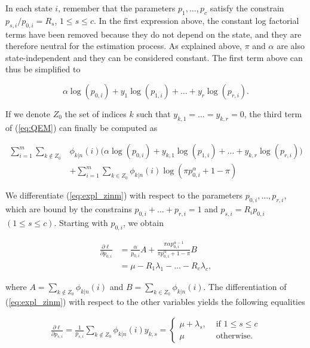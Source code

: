\documentclass[12pt]{article}
\begin{document}
\begin{appendices}
    In each state $i$, remember that the parameters
    $p_1, \ldots, p_c$ satisfy the constrain $p_{s,i}/p_{0,i}=R_s$,
    $1 \leq s \leq c$.  In the first expression above,
    the constant log factorial terms
    have been removed because they do not depend on the state,
    and they are therefore neutral for the
    estimation process. As explained above, $\pi$ and
    $\alpha$ are also state-independent and they can be considered
    constant. The first term above can thus be simplified to

    \begin{equation*}
      \alpha\log(p_{0,i}) + y_1\log(p_{1,i}) + \ldots
      + y_r\log(p_{r,i}).
    \end{equation*}

    If we denote  $Z_0$ the set of indices $k$ such that
    $y_{k,1} = \ldots = y_{k,r} = 0$, the third term of
    (\ref{eq:QEM}) can finally be computed as

    \begin{align}
      \sum_{i=1}^m\sum_{k \notin Z_0} &\phi_{k|n}(i)
      \Big(\alpha\log(p_{0,i}) + y_{k,1}\log(p_{1,i}) +
      \ldots + y_{k,r}\log(p_{r,i}) \Big) \nonumber \\
       &+ \sum_{i=1}^m\sum_{k \in Z_0} \phi_{k|n}(i)
      \log(\pi p_{0,i}^{\alpha} + 1-\pi)
\label{eq:expl_zinm}
    \end{align}

    We differentiate (\ref{eq:expl_zinm}) with respect to the parameters
    $p_{0,i}, \ldots, p_{r,i}$, which are bound by the constrains
    $p_{0,i} + \ldots + p_{r,i} = 1$ and $p_{s,i}=R_i p_{0,i}$
    $(1 \leq s \leq c)$. Starting with $p_{0,i}$, we obtain

    \begin{align}
      \frac{\partial \ell}{\partial p_{0,i}} &=
      \frac{\alpha}{p_{0,i}} A
      + \frac{\pi\alpha p_{0,i}^{\alpha-1}} {\pi p_{0,i}^{\alpha} +
      1-\pi} B \nonumber \\
      &= \mu - R_1 \lambda_1 - \ldots -R_c \lambda_c,
\label{eq:p0}
    \end{align}

    \noindent
    where $A = \sum_{k \notin Z_0} \phi_{k|n}(i)$ and
    $B =  \sum_{k \in Z_0} \phi_{k|n}(i)$.
    The differentiation of (\ref{eq:expl_zinm}) with respect to the
    other variables yields the following equalities

    \begin{align}
      \frac{\partial \ell}{\partial p_{s,i}} =
      \frac{1}{p_{s,i}} \sum_{k \notin Z_0} \phi_{k|n}(i) y_{k,s}
      = \left\{
      \begin{array}{ll}
      \mu + \lambda_s, &\mbox{ if } 1 \leq s \leq c \\
      \mu &\mbox{ otherwise.}
      \end{array}
      \right.
\label{eq:p1}
    \end{align}


\end{appendices}
\end{document}
